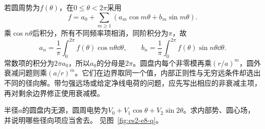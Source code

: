 若圆周势为$f(\theta)$，在$0\le\theta<2\pi$采用
\[f=a_0+\sum_{m\ge1}(a_m\cos m\theta+b_m\sin m\theta).
\]
乘$\cos n\theta$后积分，所有不同频率项相消，同阶积分为$\pi$，故
\[a_n=\frac1\pi\int_0^{2\pi}f(\theta)\cos n\theta\dd\theta,
\qquad b_n=\frac1\pi\int_0^{2\pi}f(\theta)\sin n\theta\dd\theta.
\]
常数项的积分为$2\pi a_0$，所以$a_0$的分母是$2\pi$。圆盘内每个非零模再乘$(r/a)^m$，圆外衰减问题则乘$(a/r)^m$。它们在边界取同一个值，内部正则性与无穷远条件却选出不同的径向解。带匀强远场或给定净线电荷的问题，应先写出相应的非衰减主项，再对剩余边界修正使用衰减模。


\begin{example}[圆盘内的指定角分布]\label{ex:es2-e8}
半径$a$的圆盘内无源，圆周电势为$V_0+V_1\cos\theta+V_2\sin2\theta$。求内部势、圆心场，并说明哪些径向项应当舍去。 见图~\ref{fig:es2-e8-q}。
\end{example}

